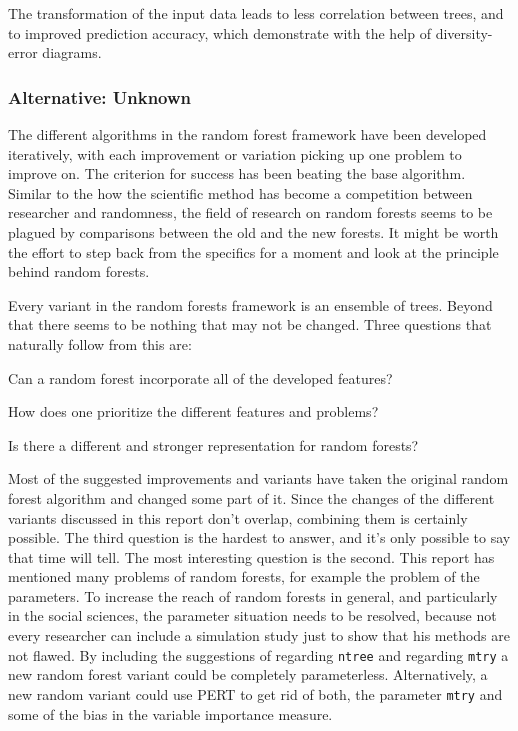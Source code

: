 \documentclass[a4paper,man,12pt,apacite,floatsintext,draftfirst]{apa6} %
\begin{document}
The transformation of the input data leads to less correlation between trees,
and to improved prediction accuracy, which \cite{rodriguez2006rotation}
demonstrate with the help of diversity-error diagrams.

\subsubsection{Alternative: Unknown}
The different algorithms in the random forest framework have been developed
iteratively, with each improvement or variation picking up one problem to
improve on.
The criterion for success has been beating the base algorithm.
Similar to the how the scientific method has become a competition between
researcher and randomness, the field of research on random forests seems
to be plagued by comparisons between the old and the new forests.
It might be worth the effort to step back from the specifics for a moment
and look at the principle behind random forests.

Every variant in the random forests framework is an ensemble of trees.
Beyond that there seems to be nothing that may not be changed.
Three questions that naturally follow from this are:

\begin{APAenumerate}
\item Can a random forest incorporate all of the developed features?
\item How does one prioritize the different features and problems?
\item Is there a different and stronger representation for random forests?
\end{APAenumerate}

Most of the suggested improvements and variants have taken the original
random forest algorithm and changed some part of it. Since the changes of
the different variants discussed in this report don't overlap, combining
them is certainly possible.
The third question is the hardest to answer, and it's only possible to say
that time will tell.
The most interesting question is the second.
This report has mentioned many problems of random forests, for example the
problem of the parameters.
To increase the reach of random forests in general, and particularly in
the social sciences, the parameter situation needs to be resolved, because
not every researcher can include a simulation study just to show that his
methods are not flawed.
By including the suggestions of \cite{banfield2007comparison} regarding
\texttt{ntree} and \cite{bernard2008forest} regarding \texttt{mtry}
a new random forest variant could be completely parameterless.
Alternatively, a new random variant could use PERT to get rid of both, the
parameter \texttt{mtry} and some of the bias in the variable importance
measure.
\end{document}
